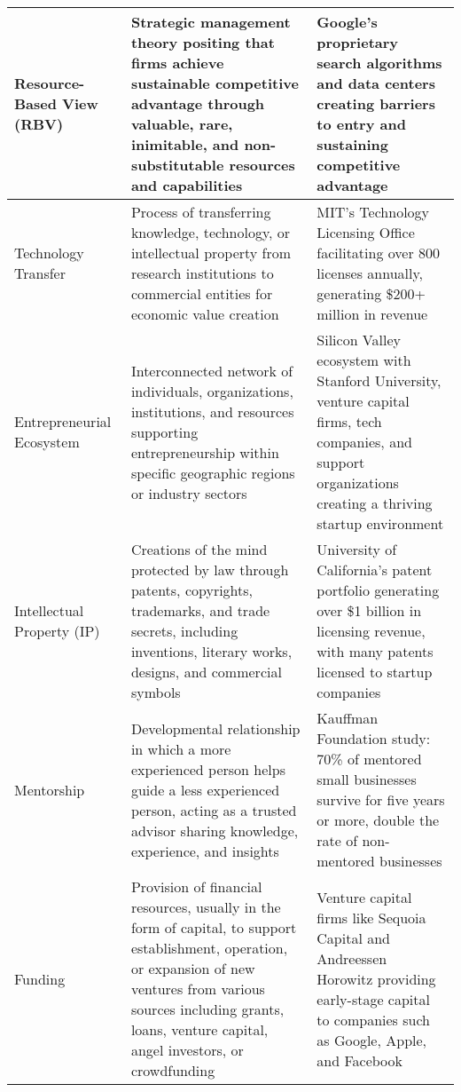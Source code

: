 \documentclass[../Main.tex]{subfiles}
\begin{document}
\begin{table}[h]
\begin{tabular}{|p{2.5cm}|p{6cm}|p{5cm}|}
\hline
Resource-Based View (RBV) & Strategic management theory positing that firms achieve sustainable competitive advantage through valuable, rare, inimitable, and non-substitutable resources and capabilities \cite{barney1991firm, wernerfelt1984resource} & Google's proprietary search algorithms and data centers creating barriers to entry and sustaining competitive advantage \\
\hline
Technology Transfer & Process of transferring knowledge, technology, or intellectual property from research institutions to commercial entities for economic value creation \cite{bozeman2000technology, siegel2003assessing} & MIT's Technology Licensing Office facilitating over 800 licenses annually, generating \$200+ million in revenue \cite{mit2024} \\
\hline
Entrepreneurial Ecosystem & Interconnected network of individuals, organizations, institutions, and resources supporting entrepreneurship within specific geographic regions or industry sectors \cite{spigel2017relational, stam2015entrepreneurial} & Silicon Valley ecosystem with Stanford University, venture capital firms, tech companies, and support organizations creating a thriving startup environment \\
\hline
Intellectual Property (IP) & Creations of the mind protected by law through patents, copyrights, trademarks, and trade secrets, including inventions, literary works, designs, and commercial symbols \cite{wipo2020intellectual} & University of California's patent portfolio generating over \$1 billion in licensing revenue, with many patents licensed to startup companies \\
\hline
Mentorship & Developmental relationship in which a more experienced person helps guide a less experienced person, acting as a trusted advisor sharing knowledge, experience, and insights \cite{jacobi1991mentorship, nationalacademies2019mentoring} & Kauffman Foundation study: 70\% of mentored small businesses survive for five years or more, double the rate of non-mentored businesses \cite{kauffman2013mentoring} \\
\hline
Funding & Provision of financial resources, usually in the form of capital, to support establishment, operation, or expansion of new ventures from various sources including grants, loans, venture capital, angel investors, or crowdfunding \cite{bruneel2010funding, lerner2018venture} & Venture capital firms like Sequoia Capital and Andreessen Horowitz providing early-stage capital to companies such as Google, Apple, and Facebook \cite{lerner2012venture} \\

\end{tabular}
\end{table}
\end{document}
